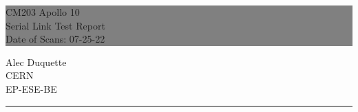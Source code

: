 \documentclass{report}
\newcommand\dateofscans{07-25-22} %
\begin{document}

\begin{titlepage} %
  
  
  \colorbox{grey}{
    \parbox[t]{0.93\textwidth}{ %
      \parbox[t]{0.91\textwidth}{ %
        \raggedleft %
        \fontsize{80pt}{40pt}\selectfont %
        \vspace{0.7cm} %

        CM203 Apollo 10\\
        Serial Link Test Report\\
        Date of Scans: \dateofscans\\
        
        \vspace{0.7cm} %
        }
      }
    }
  
  \vfill %
  
  
  \parbox[t]{0.93\textwidth}{ %
    \raggedleft %
    \large %
    {\Large Alec Duquette}\\[4pt] %
    CERN\\
    EP-ESE-BE\\[4pt] %
    
    \hfill\rule{0.2\linewidth}{1pt}%
    }
  
\end{titlepage}

\hypertarget{MyToc}{}  %
\tableofcontents
\newpage
\end{document}
